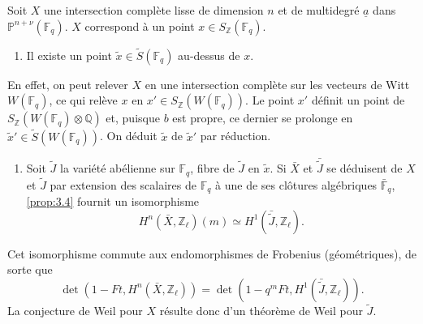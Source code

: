 \documentclass[10pt,leqno]{amsart}
\theoremstyle{plain}
\theoremstyle{definition}
\theoremstyle{remark}
\newcommand{\ZZ}{\mathbb{Z}}
\newcommand{\QQ}{\mathbb{Q}}
\newcommand{\PP}{\mathbb{P}}
\newcommand{\FF}{\mathbb{F}}
\newcommand{\ua}{\underline{a}}
\begin{document}
Soit $X$ une intersection compl\`ete lisse de dimension $n$ et de multidegr\'e $\ua$ dans $\PP^{n+\nu}(\FF_q)$. $X$ correspond \`a un point $x\in S_\ZZ(\FF_q)$.
\begin{enumerate}
\item[a)] Il existe un point $\tilde{x}\in\tilde{S}(\FF_q)$ au-dessus de $x$.
\end{enumerate}
En effet, on peut relever $X$ en une intersection compl\`ete sur les vecteurs de Witt $W(\FF_q)$, ce qui rel\`eve $x$ en $x'\in S_\ZZ(W(\FF_q))$. Le point $x'$ d\'efinit un point de $S_\ZZ(W(\FF_q)\otimes\QQ)$ et, puisque $b$ est propre, ce dernier se prolonge en $\tilde{x}'\in\tilde{S}(W(\FF_q))$. On d\'eduit $\tilde{x}$ de $\tilde{x}'$ par r\'eduction.
\begin{enumerate}
\item[b)] Soit $\tilde{J}$ la vari\'et\'e ab\'elienne sur $\FF_q$, fibre de $\tilde{J}$ en $\tilde{x}$. Si $\bar{X}$ et $\bar{\tilde{J}}$ se d\'eduisent de $X$ et $\tilde{J}$ par extension des scalaires de $\FF_q$ \`a une de ses cl\^otures alg\'ebriques $\bar{\FF}_q$, \ref{prop:3.4} fournit un isomorphisme
\[
H^n(\bar{X},\ZZ_\ell)(m)\simeq H^1(\bar{\tilde{J}},\ZZ_\ell).
\]
\end{enumerate}
Cet isomorphisme commute aux endomorphismes de Frobenius (g\'eom\'etriques), de sorte que
\begin{equation}\label{eq:3.5.1}
\det(1-Ft,H^n(\bar{X},\ZZ_\ell))=\det(1-q^mFt,H^1(\bar{\tilde{J}},\ZZ_\ell)).
\end{equation}
La conjecture de Weil pour $X$ r\'esulte donc d'un th\'eor\`eme de Weil \cite{11} pour $\tilde{J}$.
\end{document}
